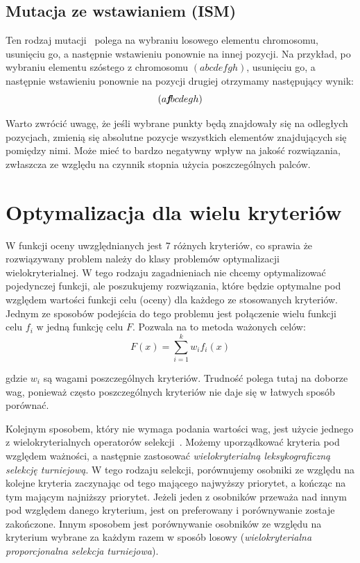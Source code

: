 \documentclass{xmgr}
\begin{document}
\subsection{Mutacja ze wstawianiem (ISM)}

Ten rodzaj mutacji~\cite{Michalewicz:2003:AGSDPE} polega na wybraniu losowego elementu chromosomu, usunięciu go, a następnie wstawieniu ponownie na innej pozycji. Na przykład, po wybraniu elementu szóstego z chromosomu $(a b c d e f g h)$, usunięciu go, a następnie wstawieniu ponownie na pozycji drugiej otrzymamy następujący wynik:
$$ (a \textit{\textbf{f}} b c d e g h) $$

Warto zwrócić uwagę, że jeśli wybrane punkty będą znajdowały się na odległych pozycjach, zmienią się absolutne pozycje wszystkich elementów znajdujących się pomiędzy nimi. Może mieć to bardzo negatywny wpływ na jakość rozwiązania, zwłaszcza ze względu na czynnik stopnia użycia poszczególnych palców.


\section{Optymalizacja dla wielu kryteriów}

W funkcji oceny uwzględnianych jest 7 różnych kryteriów, co sprawia że rozwiązywany problem należy do klasy problemów optymalizacji wielokryterialnej. W tego rodzaju zagadnieniach nie chcemy optymalizować pojedynczej funkcji, ale poszukujemy rozwiązania, które będzie optymalne pod względem wartości funkcji celu (oceny) dla każdego ze stosowanych kryteriów. Jednym ze sposobów podejścia do tego problemu jest połączenie wielu funkcji celu $f_i$ w jedną funkcję celu $F$. Pozwala na to metoda ważonych celów:
$$ F(x) = \sum_{i=1}^{k} w_i f_i (x) $$

gdzie $w_i$ są wagami poszczególnych kryteriów. Trudność polega tutaj na doborze wag, ponieważ często poszczególnych kryteriów nie daje się w łatwych sposób porównać.

Kolejnym sposobem, który nie wymaga podania wartości wag, jest użycie jednego z wielokryterialnych operatorów selekcji~\cite{Luke2009Metaheuristics}. Możemy uporządkować kryteria pod względem ważności, a następnie zastosować \emph{wielokryterialną leksykograficzną selekcję turniejową}. W tego rodzaju selekcji, porównujemy osobniki ze względu na kolejne kryteria zaczynając od tego mającego najwyższy priorytet, a kończąc na tym mającym najniższy priorytet. Jeżeli jeden z osobników przeważa nad innym pod względem danego kryterium, jest on preferowany i porównywanie zostaje zakończone. Innym sposobem jest porównywanie osobników ze względu na kryterium wybrane za każdym razem w sposób losowy (\emph{wielokryterialna proporcjonalna selekcja turniejowa}).
\end{document}
